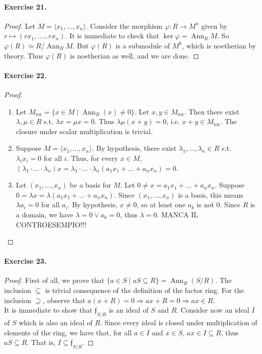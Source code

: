 \documentclass[12pt,a4paper]{report}
\theoremstyle{definition}
\theoremstyle{num.custom-title}
\DeclareMathOperator{\tor}{tor}
\DeclareMathOperator{\Ann}{Ann}
\DeclareMathOperator{\imp}{\Rightarrow}
\DeclareMathOperator{\sse}{\subseteq}
\renewcommand{\phi}{\varphi}
\begin{document}
\paragraph{Exercise 21.} 
\begin{proof}
Let $M=\langle x_1, ..., x_n \rangle$. Consider the morphism $\phi: R \to M^n$ given by $r \mapsto (r x_1, ...., r x_n)$. It is immediate to check that $\ker \phi = \Ann_R M$. So $\phi(R) \simeq R/\Ann_R M$. But $\phi(R)$ is a submodule of $M^k$, which is noetherian by theory. Thus $\phi(R)$ is noetherian as well, and we are done.
\end{proof}


\paragraph{Exercise 22.}
\begin{proof}\ 
\begin{enumerate}
\item Let $M_{\tor} = \{x \in M \mid \Ann_R (x) \neq 0\}$. Let $x,y \in M_{\tor}$. Then there exist $\lambda, \mu \in R$ s.t. $\lambda x = \mu x = 0$. Thus $\lambda \mu (x+y) =0$, i.e. $x+y \in M_{\tor}$. The closure under scalar multiplication is trivial.
\item Suppose $M= \langle x_1,...,x_n \rangle$.  By hypothesis, there exist $\lambda_1,...,\lambda_n \in R$ s.t. $\lambda_i x_i = 0$ for all $i$. Thus, for every $x \in M$, $(\lambda_1 \cdot ... \cdot \lambda_n) x= \lambda_1 \cdot ... \cdot \lambda_n (a_1 x_1 + ... + a_n x_n)=0$.
\item Let $(x_1,...,x_n)$ be a basis for $M$. Let $0 \neq x = a_1 x_1 + ... + a_n x_n$. Suppose $0 = \lambda x = \lambda (a_1 x_1 + ... + a_n x_n)$. Since $(x_1,...,x_n)$ is a basis, this means $\lambda a_i = 0$ for all $a_i$. By hypothesis, $x \neq 0$, so at least one $a_k$ is not $0$. Since $R$ is a domain, we have $\lambda = 0 \vee a_k = 0$, thus $\lambda=0$. MANCA IL CONTROESEMPIO!!!
\end{enumerate}
\end{proof}

\paragraph{Exercise 23.}
\begin{proof}
First of all, we prove that $\{a \in S \mid aS \sse R\}= \Ann_R(S/R)$. The inclusion $\sse$ is trivial consequence of the definition of the factor ring. For the inclusion $\supseteq$, observe that $a (x + R) = 0 \imp ax + R = 0 \imp ax \in R$.\\
It is immediate to show that $\mathfrak{f}_{S/R}$ is an ideal of $S$ and $R$. Consider now an ideal $I$ of $S$ which is also an ideal of $R$. Since every ideal is closed under multiplication of elements of the ring, we have that, for all $a \in I$ and $x \in S$, $a x \in I \sse R$, thus $a S \sse R$. That is, $I \sse \mathfrak{f}_{S/R}$.
\end{proof}
\end{document}
